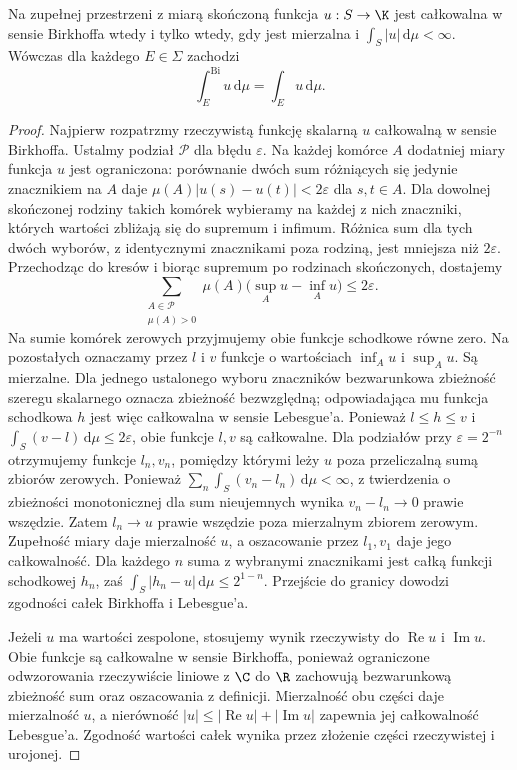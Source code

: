\begin{twierdzenie}
\label{thm:birkhoff-scalar-lebesgue15b}
Na zupełnej przestrzeni z miarą skończoną funkcja
$u:S\to\K$ jest całkowalna w sensie Birkhoffa wtedy
i tylko wtedy, gdy jest mierzalna i
$\int_S|u|\,\mathrm d\mu<\infty$.
Wówczas dla każdego $E\in\Sigma$ zachodzi
\[
 \int_E^{\mathrm{Bi}}u\,\mathrm d\mu
 =\int_E u\,\mathrm d\mu.
\]
\end{twierdzenie}
\begin{proof}
Najpierw rozpatrzmy rzeczywistą funkcję skalarną $u$
całkowalną w sensie Birkhoffa.
Ustalmy podział $\mathcal P$ dla błędu $\varepsilon$.
Na każdej komórce $A$ dodatniej miary funkcja $u$ jest
ograniczona: porównanie dwóch sum różniących się
jedynie znacznikiem na $A$ daje
$\mu(A)|u(s)-u(t)|<2\varepsilon$ dla $s,t\in A$.
Dla dowolnej skończonej rodziny takich komórek
wybieramy na każdej z nich znaczniki, których wartości
zbliżają się do supremum i infimum. Różnica sum dla
tych dwóch wyborów, z identycznymi znacznikami
poza rodziną, jest mniejsza niż $2\varepsilon$.
Przechodząc do kresów i biorąc supremum po rodzinach
skończonych, dostajemy
\[
 \sum_{\substack{A\in\mathcal P\\\mu(A)>0}}
 \mu(A)\bigl(\sup_Au-\inf_Au\bigr)\le2\varepsilon.
\]
Na sumie komórek zerowych przyjmujemy obie funkcje
schodkowe równe zero. Na pozostałych oznaczamy przez
$l$ i $v$ funkcje o wartościach $\inf_Au$ i $\sup_Au$.
Są mierzalne. Dla jednego ustalonego wyboru
znaczników bezwarunkowa zbieżność szeregu skalarnego
oznacza zbieżność bezwzględną; odpowiadająca mu
funkcja schodkowa $h$ jest więc całkowalna w sensie
Lebesgue'a. Ponieważ $l\le h\le v$ i
$\int_S(v-l)\,\mathrm d\mu\le2\varepsilon$,
obie funkcje $l,v$ są całkowalne.
Dla podziałów przy $\varepsilon=2^{-n}$ otrzymujemy
funkcje $l_n,v_n$, pomiędzy którymi leży $u$
poza przeliczalną sumą zbiorów zerowych.
Ponieważ $\sum_n\int_S(v_n-l_n)\,\mathrm d\mu<\infty$,
z twierdzenia o zbieżności monotonicznej dla sum
nieujemnych wynika $v_n-l_n\to0$ prawie wszędzie.
Zatem $l_n\to u$ prawie wszędzie poza mierzalnym
zbiorem zerowym. Zupełność miary daje mierzalność $u$,
a oszacowanie przez $l_1,v_1$ daje jego całkowalność.
Dla każdego $n$ suma z wybranymi znacznikami
jest całką funkcji schodkowej $h_n$, zaś
$\int_S|h_n-u|\,\mathrm d\mu\le2^{1-n}$.
Przejście do granicy dowodzi zgodności całek
Birkhoffa i Lebesgue'a.

Jeżeli $u$ ma wartości zespolone, stosujemy wynik
rzeczywisty do $\operatorname{Re}u$ i $\operatorname{Im}u$.
Obie funkcje są całkowalne w sensie Birkhoffa,
ponieważ ograniczone odwzorowania rzeczywiście liniowe
z $\C$ do $\R$ zachowują bezwarunkową zbieżność sum
oraz oszacowania z definicji. Mierzalność obu części
daje mierzalność $u$, a nierówność
$|u|\le|\operatorname{Re}u|+|\operatorname{Im}u|$
zapewnia jej całkowalność Lebesgue'a.
Zgodność wartości całek wynika przez złożenie
części rzeczywistej i urojonej.


\end{proof}
